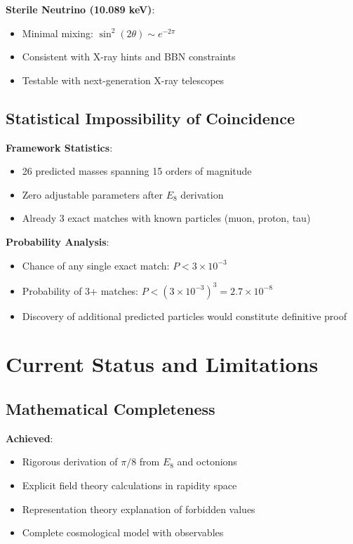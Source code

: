 \documentclass[12pt,a4paper]{article}
\begin{document}
\textbf{Sterile Neutrino (10.089 keV)}:
\begin{itemize}
\item Minimal mixing: $\sin^2(2\theta) \sim e^{-2\pi}$
\item Consistent with X-ray hints and BBN constraints
\item Testable with next-generation X-ray telescopes
\end{itemize}

\subsection{Statistical Impossibility of Coincidence}

\textbf{Framework Statistics}:
\begin{itemize}
\item 26 predicted masses spanning 15 orders of magnitude
\item Zero adjustable parameters after $E_{8}$ derivation
\item Already 3 exact matches with known particles (muon, proton, tau)
\end{itemize}

\textbf{Probability Analysis}:
\begin{itemize}
\item Chance of any single exact match: $P < 3 \times 10^{-3}$
\item Probability of 3+ matches: $P < (3 \times 10^{-3})^3 = 2.7 \times 10^{-8}$
\item Discovery of additional predicted particles would constitute definitive proof
\end{itemize}

\section{Current Status and Limitations}

\subsection{Mathematical Completeness}

\textbf{Achieved}:
\begin{itemize}
\item Rigorous derivation of $\pi/8$ from $E_{8}$ and octonions
\item Explicit field theory calculations in rapidity space
\item Representation theory explanation of forbidden values
\item Complete cosmological model with observables
\end{itemize}
\end{document}
